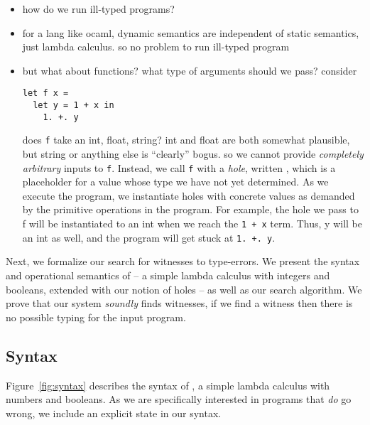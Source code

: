 
\begin{itemize}
\item how do we run ill-typed programs?
\item for a lang like ocaml, dynamic semantics are independent of static
  semantics, just lambda calculus. so no problem to run ill-typed
  program
\item but what about functions? what type of arguments should we pass? consider

\begin{lstlisting}
let f x = 
  let y = 1 + x in
    1. +. y
\end{lstlisting}

does \texttt{f} take an int, float, string? int and float are both
somewhat plausible, but string or anything else is ``clearly'' bogus. so
we cannot provide \emph{completely arbitrary} inputs to
\texttt{f}. Instead, we call \texttt{f} with a \emph{hole}, written
\ehole{}, which is a placeholder for a value whose type we have not
yet determined. As we execute the program, we instantiate holes with
concrete values as demanded by the primitive operations in the
program. For example, the hole we pass to f will be instantiated to an
int when we reach the \lstinline{1 + x} term. Thus, y will be an int as
well, and the program will get stuck at \lstinline{1. +. y}. 

\end{itemize}

Next, we formalize our search for witnesses to type-errors.
%
We present the syntax and operational semantics of \lang -- a simple
lambda calculus with integers and booleans, extended with our notion of
holes -- as well as our search algorithm.
%
We prove that our system \emph{soundly} finds witnesses, \ie if we find
a witness then there is no possible typing for the input program.
%
\subsection{Syntax}
\label{sec:syntax}

%
Figure~\ref{fig:syntax} describes the syntax of \lang, a simple lambda
calculus with numbers and booleans.
%
As we are specifically interested in
programs that \emph{do} go wrong, we include an explicit \stuck state in
our syntax.
%
